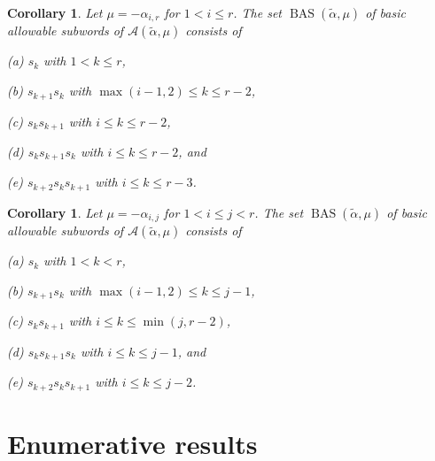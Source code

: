 \documentclass{amsart}
\newtheorem{corollary}[theorem]{Corollary}
\theoremstyle{definition}
\DeclareMathOperator{\BAS}{BAS}
\newcommand{\hroot}{\tilde{\alpha}}
\begin{document}
\begin{corollary}\label{cor:BASir}
Let $\mu = -\alpha_{i,r}$ for $1 < i \leq r$.
The set $\BAS(\hroot, \mu)$ of basic allowable subwords of $\mathcal{A}(\hroot, \mu)$ consists of
\begin{enumerate}
\noindent \begin{minipage}{0.45\textwidth}
    \item[(a)] $s_k$ with $1 < k \leq r$,
    \item[(b)] $s_{k+1}s_k$ with $\max(i-1,2) \leq k \leq r-2$,
    \item[(c)] $s_ks_{k+1}$ with $i \leq k \leq r-2$,
\end{minipage}
\begin{minipage}{0.45\textwidth}
    \item[(d)] $s_ks_{k+1}s_k$ with $i \leq k \leq r-2$, and 
    \item[(e)] $s_{k+2}s_ks_{k+1}$ with $i \leq k \leq r-3$.
\end{minipage}
\end{enumerate}
\end{corollary}



\begin{corollary}\label{cor:BASij}
Let $\mu = -\alpha_{i,j}$ for $1 < i \leq j < r$.
The set $\BAS(\hroot, \mu)$ of basic allowable subwords of $\mathcal{A}(\hroot, \mu)$ consists of 
\begin{enumerate}
\noindent \begin{minipage}{0.45\textwidth}
    \item[(a)] $s_k$ with $1 < k < r$,
    \item[(b)] $s_{k+1}s_k$ with $\max(i-1,2) \leq k \leq j-1$,
    \item[(c)] $s_ks_{k+1}$ with $i \leq k \leq \min(j,r-2)$,
\end{minipage}
\begin{minipage}{0.45\textwidth}
    \item[(d)] $s_ks_{k+1}s_k$ with $i \leq k \leq j-1$, and 
    \item[(e)] $s_{k+2}s_ks_{k+1}$ with $i \leq k \leq j-2$.
\end{minipage}
\end{enumerate}
\end{corollary}





\section{Enumerative results}\label{sec:enumerative}
\end{document}
